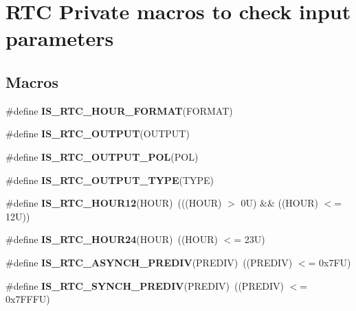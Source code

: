 \hypertarget{group___r_t_c___i_s___r_t_c___definitions}{}\section{R\+TC Private macros to check input parameters}
\label{group___r_t_c___i_s___r_t_c___definitions}
\subsection*{Macros}
\begin{DoxyCompactItemize}
\item 
\#define {\bfseries I\+S\+\_\+\+R\+T\+C\+\_\+\+H\+O\+U\+R\+\_\+\+F\+O\+R\+M\+AT}(F\+O\+R\+M\+AT)
\item 
\#define {\bfseries I\+S\+\_\+\+R\+T\+C\+\_\+\+O\+U\+T\+P\+UT}(O\+U\+T\+P\+UT)
\item 
\#define {\bfseries I\+S\+\_\+\+R\+T\+C\+\_\+\+O\+U\+T\+P\+U\+T\+\_\+\+P\+OL}(P\+OL)
\item 
\#define {\bfseries I\+S\+\_\+\+R\+T\+C\+\_\+\+O\+U\+T\+P\+U\+T\+\_\+\+T\+Y\+PE}(T\+Y\+PE)
\item 
\mbox{\label{group___r_t_c___i_s___r_t_c___definitions_ga6bdfe3bed0a57dfafc2d1de785d48a62}} 
\#define {\bfseries I\+S\+\_\+\+R\+T\+C\+\_\+\+H\+O\+U\+R12}(H\+O\+UR)~(((H\+O\+UR) $>$ 0\+U) \&\& ((\+H\+O\+U\+R) $<$= 12\+U))
\item 
\mbox{\label{group___r_t_c___i_s___r_t_c___definitions_ga4883613bec76074ac62608b89e3f48a8}} 
\#define {\bfseries I\+S\+\_\+\+R\+T\+C\+\_\+\+H\+O\+U\+R24}(H\+O\+UR)~((H\+O\+UR) $<$= 23\+U)
\item 
\mbox{\label{group___r_t_c___i_s___r_t_c___definitions_gac20f6c94ede2d474df8ba4acb7328d93}} 
\#define {\bfseries I\+S\+\_\+\+R\+T\+C\+\_\+\+A\+S\+Y\+N\+C\+H\+\_\+\+P\+R\+E\+D\+IV}(P\+R\+E\+D\+IV)~((P\+R\+E\+D\+IV) $<$= 0x7\+F\+U)
\item 
\mbox{\label{group___r_t_c___i_s___r_t_c___definitions_ga32fccaa6ec65f9fceb3e6e4f31ab11cf}} 
\#define {\bfseries I\+S\+\_\+\+R\+T\+C\+\_\+\+S\+Y\+N\+C\+H\+\_\+\+P\+R\+E\+D\+IV}(P\+R\+E\+D\+IV)~((P\+R\+E\+D\+IV) $<$= 0x7\+F\+F\+F\+U)

\end{DoxyCompactItemize}

